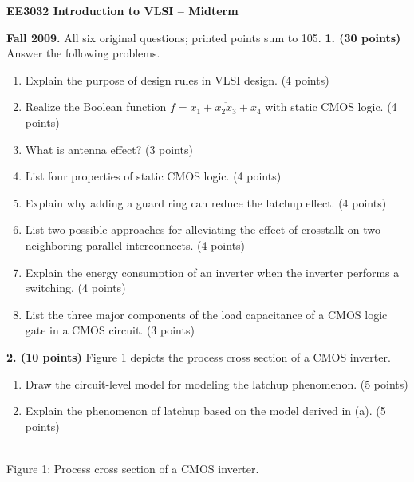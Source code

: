 \documentclass[10pt]{article}
\newcommand{\grd}[2]{\draw(#1,#2)--(#1,#2-.12);\draw(#1-.15,#2-.12)--(#1+.15,#2-.12);\draw(#1-.1,#2-.19)--(#1+.1,#2-.19);}
\begin{document}
\begin{center}{\large\bfseries EE3032 Introduction to VLSI -- Midterm}\end{center}
\textbf{Fall 2009.} All six original questions; printed points sum to 105.
\textbf{1. (30 points)} Answer the following problems.
\begin{enumerate}[label=(\alph*),leftmargin=7mm,itemsep=1pt]
\item Explain the purpose of design rules in VLSI design. (4 points)
\item Realize the Boolean function $f=\overline{x_1+x_2x_3+x_4}$ with static CMOS logic. (4 points)
\item What is antenna effect? (3 points)
\item List four properties of static CMOS logic. (4 points)
\item Explain why adding a guard ring can reduce the latchup effect. (4 points)
\item List two possible approaches for alleviating the effect of crosstalk on two neighboring parallel interconnects. (4 points)
\item Explain the energy consumption of an inverter when the inverter performs a switching. (4 points)
\item List the three major components of the load capacitance of a CMOS logic gate in a CMOS circuit. (3 points)
\end{enumerate}
\textbf{2. (10 points)} Figure 1 depicts the process cross section of a CMOS inverter.
\begin{enumerate}[label=(\alph*),leftmargin=7mm]
\item Draw the circuit-level model for modeling the latchup phenomenon. (5 points)
\item Explain the phenomenon of latchup based on the model derived in (a). (5 points)
\end{enumerate}
\begin{center}\\Figure 1: Process cross section of a CMOS inverter.\end{center}
\end{document}
